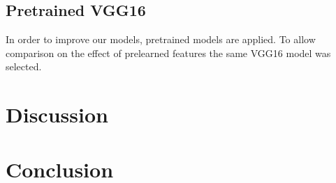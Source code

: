 \documentclass[10pt, final]{article}
\begin{document}
\subsection{Pretrained VGG16}
In order to improve our models, pretrained models are applied.
To allow comparison on the effect of prelearned features the same VGG16 model was selected.


\section{Discussion} \label{sec:discussion}
\section{Conclusion} \label{sec:conclusion}
\newpage
\listoffigures
\newpage
\listoftables
\newpage
\printbibliography
\end{document}
